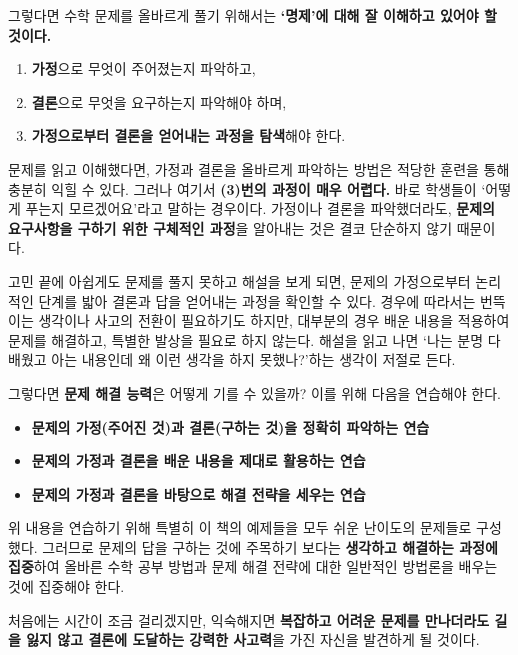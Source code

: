\bigskip

\pagebreak

그렇다면 수학 문제를 올바르게 풀기 위해서는 \textbf{`명제'에 대해 잘 이해하고 있어야 할 것이다.}

\begin{enumerate}
    \item \textbf{가정}으로 무엇이 주어졌는지 파악하고,
    \item \textbf{결론}으로 무엇을 요구하는지 파악해야 하며,
    \item \textbf{가정으로부터 결론을 얻어내는 과정을 탐색}해야 한다.
\end{enumerate}

문제를 읽고 이해했다면, 가정과 결론을 올바르게 파악하는 방법은 적당한 훈련을 통해 충분히 익힐 수 있다. 그러나 여기서 \textbf{(3)번의 과정이 매우 어렵다.} 바로 학생들이 `어떻게 푸는지 모르겠어요'라고 말하는 경우이다. 가정이나 결론을 파악했더라도, \textbf{문제의 요구사항을 구하기 위한 구체적인 과정}을 알아내는 것은 결코 단순하지 않기 때문이다.

\medskip

고민 끝에 아쉽게도 문제를 풀지 못하고 해설을 보게 되면, 문제의 가정으로부터 논리적인 단계를 밟아 결론과 답을 얻어내는 과정을 확인할 수 있다. 경우에 따라서는 번뜩이는 생각이나 사고의 전환이 필요하기도 하지만, 대부분의 경우 배운 내용을 적용하여 문제를 해결하고, 특별한 발상을 필요로 하지 않는다. 해설을 읽고 나면 `나는 분명 다 배웠고 아는 내용인데 왜 이런 생각을 하지 못했나?'하는 생각이 저절로 든다.

\medskip

그렇다면 \textbf{문제 해결 능력}은 어떻게 기를 수 있을까? 이를 위해 다음을 연습해야 한다.
\begin{itemize}
    \item \textbf{문제의 가정(주어진 것)과 결론(구하는 것)을 정확히 파악하는 연습}
    \item \textbf{문제의 가정과 결론을  배운 내용을 제대로 활용하는 연습}
    \item \textbf{문제의 가정과 결론을 바탕으로 해결 전략을 세우는 연습}
\end{itemize}
위 내용을 연습하기 위해 특별히 이 책의 예제들을 모두 쉬운 난이도의 문제들로 구성했다. 그러므로 문제의 답을 구하는 것에 주목하기 보다는 \textbf{생각하고 해결하는 과정에 집중}하여 올바른 수학 공부 방법과 문제 해결 전략에 대한 일반적인 방법론을 배우는 것에 집중해야 한다.

\medskip

처음에는 시간이 조금 걸리겠지만, 익숙해지면 \textbf{복잡하고 어려운 문제를 만나더라도 길을 잃지 않고 결론에 도달하는 강력한 사고력}을 가진 자신을 발견하게 될 것이다.

\pagebreak
